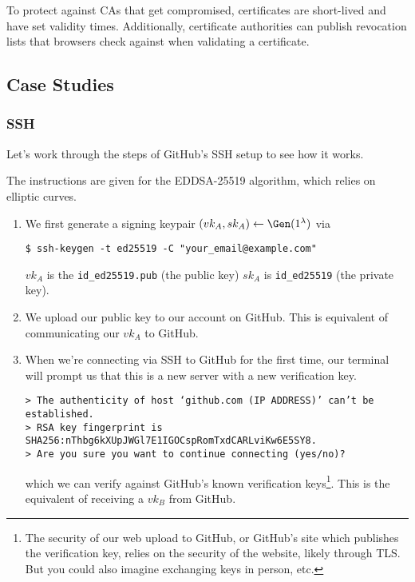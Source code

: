 To protect against CAs that get compromised, certificates are short-lived and have set validity times. Additionally, certificate authorities can publish revocation lists that browsers check against when validating a certificate.

\subsection{Case Studies}

\subsubsection{SSH}


Let's work through the steps of GitHub's SSH setup to see how it works.


The instructions are given for the EDDSA-25519 algorithm, which relies on elliptic curves.

\begin{enumerate}
    \item We first generate a signing keypair $(vk_A, sk_A) \leftarrow \Gen(1^\lambda)$ via

          \texttt{\$ ssh-keygen -t ed25519 -C "your\_email@example.com"}

          $vk_A$ is the \texttt{id\_ed25519.pub} (the public key) $sk_A$ is \texttt{id\_ed25519} (the private key).
    \item We upload our public key to our account on GitHub. This is equivalent of communicating our $vk_A$ to GitHub.
    \item When we're connecting via SSH to GitHub for the first time, our terminal will prompt us that this is a new server with a new verification key.

          \texttt{> The authenticity of host `github.com (IP ADDRESS)' can't be established. \\
              > RSA key fingerprint is SHA256:nThbg6kXUpJWGl7E1IGOCspRomTxdCARLviKw6E5SY8. \\
              > Are you sure you want to continue connecting (yes/no)?}

          which we can verify against GitHub's known verification keys\footnote{The security of our web upload to GitHub, or GitHub's site which publishes the verification key, relies on the security of the website, likely through TLS. But you could also imagine exchanging keys in person, etc. }. This is the equivalent of receiving a $vk_B$ from GitHub.
\end{enumerate}

